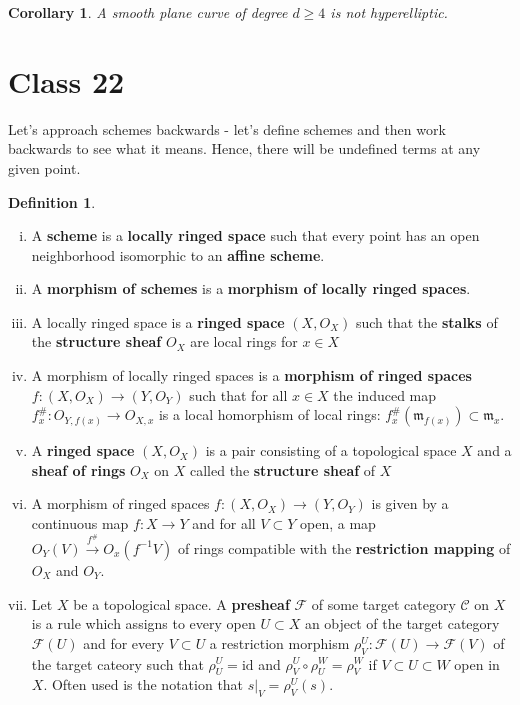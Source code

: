 \documentclass{article}
\newcommand{\fr}{\mathfrak}
\theoremstyle{plain}
\newtheorem*{cor*}{Corollary}
\theoremstyle{definition}
\newtheorem{defn}{Definition}
\theoremstyle{remark}
\begin{document}
\begin{cor*}
A smooth plane curve of degree $d\geq 4$ is not hyperelliptic.
\end{cor*}

\newpage
\section*{Class 22}

Let's approach schemes backwards - let's define schemes and then work backwards to see what it means. Hence, there will be undefined terms at any given point.

\begin{defn}\hspace{1mm}
\begin{enumerate}[(i)]
\item A \textbf{scheme} is a \textbf{locally ringed space} such that every point has an open neighborhood isomorphic to an \textbf{affine scheme}.
\item A \textbf{morphism of schemes} is a \textbf{morphism of locally ringed spaces}.
\item A locally ringed space is a \textbf{ringed space} $(X,O_X)$ such that the \textbf{stalks} of the \textbf{structure sheaf} $O_X$ are local rings for $x\in X$
\item A morphism of locally ringed spaces is a \textbf{morphism of ringed spaces} $f:(X,O_X)\to(Y,O_Y)$ such that for all $x\in X$ the induced map $f_x^\#:O_{Y,f(x)}\to O_{X,x}$ is a local homorphism of local rings: $f_x^\#(\fr m_{f(x)})\subset\fr m_x$.
\item A \textbf{ringed space} $(X,O_X)$ is a pair consisting of a topological space $X$ and a \textbf{sheaf of rings} $O_X$ on $X$ called the \textbf{structure sheaf} of $X$
\item A morphism of ringed spaces $f:(X,O_X)\to(Y,O_Y)$ is given by a continuous map $f:X\to Y$ and for all $V\subset Y$ open, a map $O_Y(V)\overset{f^\#}{\to}O_x(f^{-1}V)$ of rings compatible with the \textbf{restriction mapping} of $O_X$ and $O_Y$.
\item Let $X$ be a topological space. A \textbf{presheaf} $\mathcal{F}$ of some target category $\mathcal{C}$ on $X$ is a rule which assigns to every open $U\subset X$ an object of the target category $\mathcal{F}(U)$ and for every $V\subset U$ a restriction morphism $\rho^U_V:\mathcal{F}(U)\to\mathcal{F}(V)$ of the target cateory such that $\rho^U_U=\text{id}$ and $\rho^U_V\circ\rho^W_U=\rho^W_V$ if $V\subset U\subset W$ open in $X$.  Often used is the notation that $s|_V=\rho^U_V(s)$.

\end{enumerate}
\end{defn}
\end{document}
